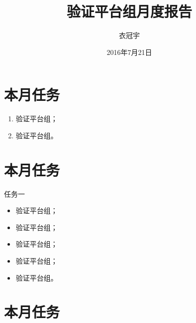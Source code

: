 \documentclass[cjk]{beamer}
\title[中国科学院通用芯片与基础软件研究中心 CPU and OS Research Center CAS]{验证平台组月度报告} %
\author{衣冠宇} %
\institute[CAS] %
{
  中国科学院通用芯片与基础软件研究中心 \\ %
  \medskip
  验证平台组
}
\date{2016年7月21日} %
\begin{document}
\begin{CJK}{UTF8}{gbsn}

  \begin{frame}
    \titlepage %
  \end{frame}


  \section{本月任务} %

  \begin{frame}
    \begin{enumerate}
    \item 验证平台组；
    \item 验证平台组。
    \end{enumerate}
  \end{frame}

  \section{本月任务}

  \begin{frame}
    \begin{block}{任务一}
      \begin{itemize}
      \item 验证平台组；
      \item 验证平台组；
      \item 验证平台组；
      \item 验证平台组；
      \item 验证平台组。
      \end{itemize}
    \end{block}
  \end{frame}

  \section{本月任务}


\end{CJK}
\end{document}
